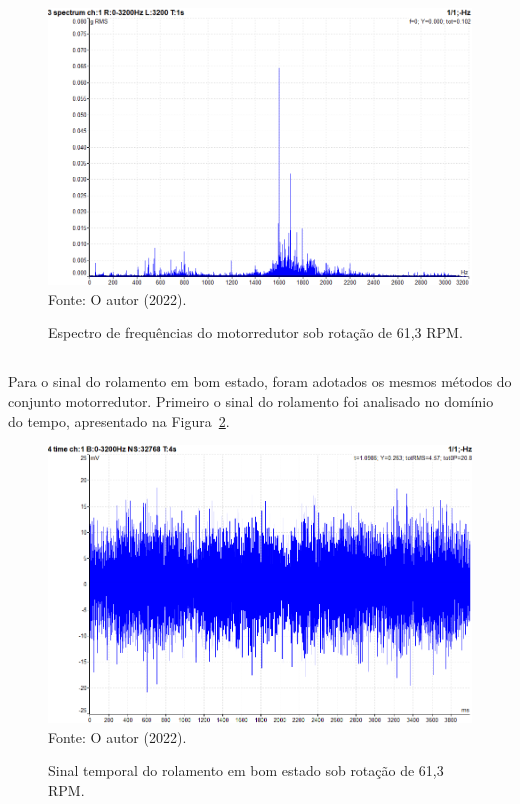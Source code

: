 \documentclass[
	12pt,				
	oneside,			
	a4paper,			
	english,			
	brazil,			
	]{abntex2ppgsi}
\begin{document}
\begin{figure}[H]
\centering
\caption {Espectro de frequências do motorredutor sob rotação de 61,3 RPM.}
\includegraphics[width=\textwidth,keepaspectratio]{ESPECTRO_ACELERACAO_MOTORREDUTOR_100HZ} \\
Fonte: O autor (2022).
\label{ESPECTRO_ACELERACAO_MOTORREDUTOR_100HZ}
\end{figure}

\subsection{}

Para o sinal do rolamento em bom estado, foram adotados os mesmos métodos do conjunto motorredutor. Primeiro o sinal do rolamento foi analisado no domínio do tempo, apresentado na Figura~\ref{ROLAMENTO_BOM_ESTADO_TEMPO}.

\begin{figure}[H]
\centering
\caption {Sinal temporal do rolamento em bom estado sob rotação de 61,3 RPM.}
\includegraphics[width=\textwidth,keepaspectratio]{ROLAMENTO_BOM_ESTADO_TEMPO} \\
Fonte: O autor (2022).
\label{ROLAMENTO_BOM_ESTADO_TEMPO}
\end{figure}
\end{document}
